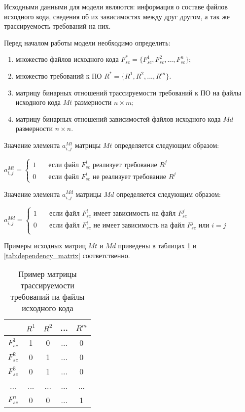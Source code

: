 Исходными данными для модели являются: информация о составе файлов исходного кода, сведения об их зависимостях между друг другом, а так же трассируемость требований на них.

Перед началом работы модели необходимо определить:
\begin{enumerate}
    \item множество файлов исходного кода $F_{sc}^* = \{F_{sc}^1, F_{sc}^2, ..., F_{sc}^{n}\}$;
    \item множество требований к ПО $R^* = \{R^1, R^2, ..., R^m\}$.
    \item матрицу бинарных отношений трассируемости требований к ПО на файлы исходного кода $Mt$ размерности $n \times m$;
    \item матрицу бинарных отношений зависимостей файлов исходного кода $Md$ размерности $n \times n$.
\end{enumerate}

Значение элемента $a_{i,j}^{Mt}$ матрицы $Mt$ определяется следующим образом:

$
a_{i,j}^{Mt} = \begin{cases}
    1  & \quad \text{если файл } F_{sc}^i \text{ реализует требование } R^j\\
    0  & \quad \text{если файл } F_{sc}^i \text{ не реализует требование } R^j
  \end{cases}
$

Значение элемента $a_{i,j}^{Md}$ матрицы $Md$ определяется следующим образом:

$
a_{i,j}^{Md} = \begin{cases}
    1  & \quad \text{если файл } F_{sc}^i \text{ имеет зависимость на файл } F_{sc}^j\\
    0  & \quad \text{если файл } F_{sc}^i \text{ не имеет зависимость на файл } F_{sc}^j \text{ или } i = j\\
  \end{cases}
$

Примеры исходных матриц $Mt$ и $Md$ приведены в таблицах \ref{tab:requirements_traceability_matrix} и \ref{tab:dependency_matrix} соответственно.

\begin{longtable}{|c|c|c|c|c|}
\caption{Пример матрицы трассируемости требований на файлы исходного кода}
\label{tab:requirements_traceability_matrix}\\
\hline
& \cellcolor{ash-grey} $R^1$ 
& \cellcolor{ash-grey} $R^2$ 
& ... 
& \cellcolor{ash-grey} $R^m$ \\
\hline
\cellcolor{platinum} $F_{sc}^1$ & \cellcolor{light-colar} 1 & 0 & ... & 0 \\
\hline
\cellcolor{platinum} $F_{sc}^2$ & 0 & \cellcolor{light-orange} 1 & ... & 0 \\
\hline
\cellcolor{platinum} $F_{sc}^3$ & 0 & \cellcolor{crayola} 1 & ... & 0 \\
\hline
... & ... & ... & ... & ... \\
\hline
\cellcolor{platinum} $F_{sc}^n$ & 0 & 0 & ... & \cellcolor{light-green} 1 \\
\hline
\end{longtable}

